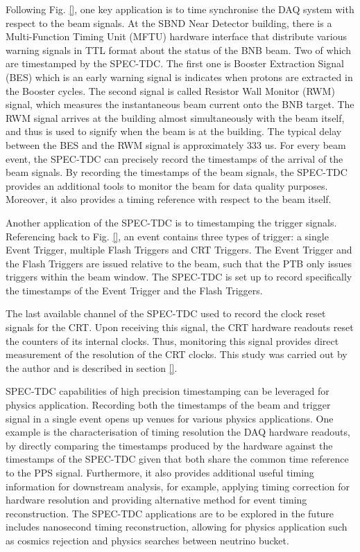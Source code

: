 Following Fig. \ref{}, one key application is to time synchronise the DAQ system with respect to the beam signals.
At the SBND Near Detector building, there is a Multi-Function Timing Unit (MFTU) hardware interface that distribute various warning signals in TTL format about the status of the BNB beam.
Two of which are timestamped by the SPEC-TDC.
The first one is Booster Extraction Signal (BES) which is an early warning signal is indicates when protons are extracted in the Booster cycles.
The second signal is called Resistor Wall Monitor (RWM) signal, which measures the instantaneous beam current onto the BNB target.
The RWM signal arrives at the building almost simultaneously with the beam itself, and thus is used to signify when the beam is at the building.
The typical delay between the BES and the RWM signal is approximately 333 us.
For every beam event, the SPEC-TDC can precisely record the timestamps of the arrival of the beam signals.
By recording the timestamps of the beam signals, the SPEC-TDC provides an additional tools to monitor the beam for data quality purposes.
Moreover, it also provides a timing reference with respect to the beam itself.

Another application of the SPEC-TDC is to timestamping the trigger signals. 
Referencing back to Fig. \ref{}, an event contains three types of trigger: a single Event Trigger, multiple Flash Triggers and CRT Triggers. 
The Event Trigger and the Flash Triggers are issued relative to the beam, such that the PTB only issues triggers within the beam window.   
The SPEC-TDC is set up to record specifically the timestamps of the Event Trigger and the Flash Triggers.

The last available channel of the SPEC-TDC used to record the clock reset signals for the CRT. 
Upon receiving this signal, the CRT hardware readouts reset the counters of its internal clocks.
Thus, monitoring this signal provides direct measurement of the resolution of the CRT clocks.
This study was carried out by the author and is described in section \ref{}.

SPEC-TDC capabilities of high precision timestamping can be leveraged for physics application.
Recording both the timestamps of the beam and trigger signal in a single event opens up venues for various physics applications. 
One example is the characterisation of timing resolution the DAQ hardware readouts, by directly comparing the timestamps produced by the hardware against the timestamps of the SPEC-TDC given that both share the common time reference to the PPS signal.
Furthermore, it also provides additional useful timing information for downstream analysis, for example, applying timing correction for hardware resolution and providing alternative method for event timing reconstruction. 
The SPEC-TDC applications are to be explored in the future includes nanosecond timing reconstruction, allowing for physics application such as cosmics rejection and physics searches between neutrino bucket.

